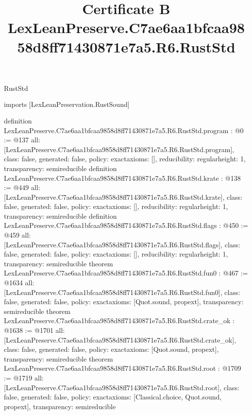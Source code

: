 \begin{lexlean}{RustStd}
\title{Certificate B LexLeanPreserve.C7ae6aa1bfcaa9858d8ff71430871e7a5.R6.RustStd}
\begin{coremodule}
imports [LexLeanPreservation.RustSound]

definition LexLeanPreserve.C7ae6aa1bfcaa9858d8ff71430871e7a5.R6.RustStd.program : @0 := @137 {
  all: [LexLeanPreserve.C7ae6aa1bfcaa9858d8ff71430871e7a5.R6.RustStd.program],
  class: false,
  generated: false,
  policy: exact{axioms: []},
  reducibility: regular{height: 1},
  transparency: semireducible
}
definition LexLeanPreserve.C7ae6aa1bfcaa9858d8ff71430871e7a5.R6.RustStd.krate : @138 := @449 {
  all: [LexLeanPreserve.C7ae6aa1bfcaa9858d8ff71430871e7a5.R6.RustStd.krate],
  class: false,
  generated: false,
  policy: exact{axioms: []},
  reducibility: regular{height: 1},
  transparency: semireducible
}
definition LexLeanPreserve.C7ae6aa1bfcaa9858d8ff71430871e7a5.R6.RustStd.flags : @450 := @459 {
  all: [LexLeanPreserve.C7ae6aa1bfcaa9858d8ff71430871e7a5.R6.RustStd.flags],
  class: false,
  generated: false,
  policy: exact{axioms: []},
  reducibility: regular{height: 1},
  transparency: semireducible
}
theorem LexLeanPreserve.C7ae6aa1bfcaa9858d8ff71430871e7a5.R6.RustStd.fun0 : @467 := @1634 {
  all: [LexLeanPreserve.C7ae6aa1bfcaa9858d8ff71430871e7a5.R6.RustStd.fun0],
  class: false,
  generated: false,
  policy: exact{axioms: [Quot.sound, propext]},
  transparency: semireducible
}
theorem LexLeanPreserve.C7ae6aa1bfcaa9858d8ff71430871e7a5.R6.RustStd.crate_ok : @1638 := @1701 {
  all: [LexLeanPreserve.C7ae6aa1bfcaa9858d8ff71430871e7a5.R6.RustStd.crate_ok],
  class: false,
  generated: false,
  policy: exact{axioms: [Quot.sound, propext]},
  transparency: semireducible
}
theorem LexLeanPreserve.C7ae6aa1bfcaa9858d8ff71430871e7a5.R6.RustStd.root : @1709 := @1719 {
  all: [LexLeanPreserve.C7ae6aa1bfcaa9858d8ff71430871e7a5.R6.RustStd.root],
  class: false,
  generated: false,
  policy: exact{axioms: [Classical.choice, Quot.sound, propext]},
  transparency: semireducible
}


\end{coremodule}
\end{lexlean}
